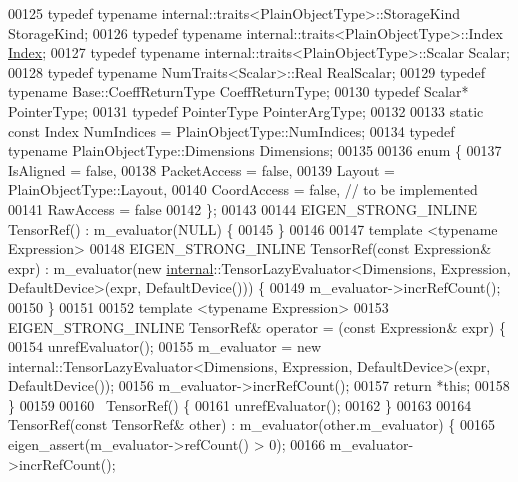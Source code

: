 \begin{DoxyCode}
00125     \textcolor{keyword}{typedef} \textcolor{keyword}{typename} internal::traits<PlainObjectType>::StorageKind StorageKind;
00126     \textcolor{keyword}{typedef} \textcolor{keyword}{typename} internal::traits<PlainObjectType>::Index \hyperlink{namespace_eigen_a62e77e0933482dafde8fe197d9a2cfde}{Index};
00127     \textcolor{keyword}{typedef} \textcolor{keyword}{typename} internal::traits<PlainObjectType>::Scalar Scalar;
00128     \textcolor{keyword}{typedef} \textcolor{keyword}{typename} NumTraits<Scalar>::Real RealScalar;
00129     \textcolor{keyword}{typedef} \textcolor{keyword}{typename} Base::CoeffReturnType CoeffReturnType;
00130     \textcolor{keyword}{typedef} Scalar* PointerType;
00131     \textcolor{keyword}{typedef} PointerType PointerArgType;
00132 
00133     \textcolor{keyword}{static} \textcolor{keyword}{const} Index NumIndices = PlainObjectType::NumIndices;
00134     \textcolor{keyword}{typedef} \textcolor{keyword}{typename} PlainObjectType::Dimensions Dimensions;
00135 
00136     \textcolor{keyword}{enum} \{
00137       IsAligned = \textcolor{keyword}{false},
00138       PacketAccess = \textcolor{keyword}{false},
00139       Layout = PlainObjectType::Layout,
00140       CoordAccess = \textcolor{keyword}{false},  \textcolor{comment}{// to be implemented}
00141       RawAccess = \textcolor{keyword}{false}
00142     \};
00143 
00144     EIGEN\_STRONG\_INLINE TensorRef() : m\_evaluator(NULL) \{
00145     \}
00146 
00147     \textcolor{keyword}{template} <\textcolor{keyword}{typename} Expression>
00148     EIGEN\_STRONG\_INLINE TensorRef(\textcolor{keyword}{const} Expression& expr) : m\_evaluator(new 
      \hyperlink{namespaceinternal}{internal}::TensorLazyEvaluator<Dimensions, Expression, DefaultDevice>(expr, DefaultDevice())) \{
00149       m\_evaluator->incrRefCount();
00150     \}
00151 
00152     \textcolor{keyword}{template} <\textcolor{keyword}{typename} Expression>
00153     EIGEN\_STRONG\_INLINE TensorRef& operator = (\textcolor{keyword}{const} Expression& expr) \{
00154       unrefEvaluator();
00155       m\_evaluator = \textcolor{keyword}{new} internal::TensorLazyEvaluator<Dimensions, Expression, DefaultDevice>(expr, 
      DefaultDevice());
00156       m\_evaluator->incrRefCount();
00157       \textcolor{keywordflow}{return} *\textcolor{keyword}{this};
00158     \}
00159 
00160     ~TensorRef() \{
00161       unrefEvaluator();
00162     \}
00163 
00164     TensorRef(\textcolor{keyword}{const} TensorRef& other) : m\_evaluator(other.m\_evaluator) \{
00165       eigen\_assert(m\_evaluator->refCount() > 0);
00166       m\_evaluator->incrRefCount();

\end{DoxyCode}
